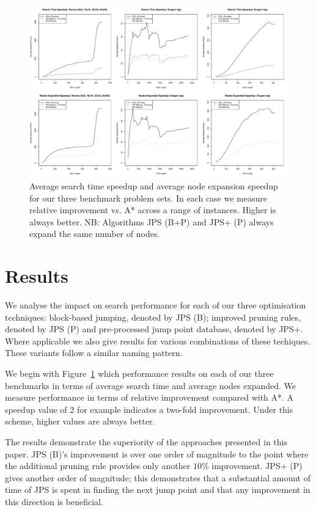 \begin{figure}[tb]
       \begin{center}
		   \includegraphics[width=0.95\columnwidth, trim = 0mm 0mm 0mm 0mm]
			{diagrams/speedup.pdf}
       \end{center}
\caption{Average search time speedup and average node expansion speedup for our three benchmark problem sets. In each case we measure relative improvement vs. A* 
across a range of instances. Higher is always better. NB: Algorithms JPS (B+P) and JPS+ (P) always expand the same number of nodes. }
\label{fig::speedup}
\end{figure}

\section{Results}
\label{sec::results}

We analyse the impact on search performance for each of our three optimisation techniques:
block-based jumping, denoted by JPS (B); improved pruning rules, denoted by JPS (P) and 
pre-processed jump point database, denoted by JPS+.
Where applicable we also give results for various combinations of these techiques. These 
variants follow a similar naming pattern.

We begin with Figure~\ref{fig::speedup} which performance results on each of our three
benchmarks in terms of average search time and average nodes expanded. We measure performance
in terms of relative improvement compared with A*. A speedup value of 2 for example indicates 
a two-fold improvement. Under this scheme, higher values are always better.

The results demonstrate the superiority of the approaches presented in this paper.  JPS (B)'s improvement is over one order of magnitude to the point where the additional pruning rule provides only another $10\%$ improvement.  JPS+ (P) gives another order of magnitude; this demonstrates that a substantial amount of time of JPS is spent in finding the next jump point and that any improvement in this direction is beneficial.  

